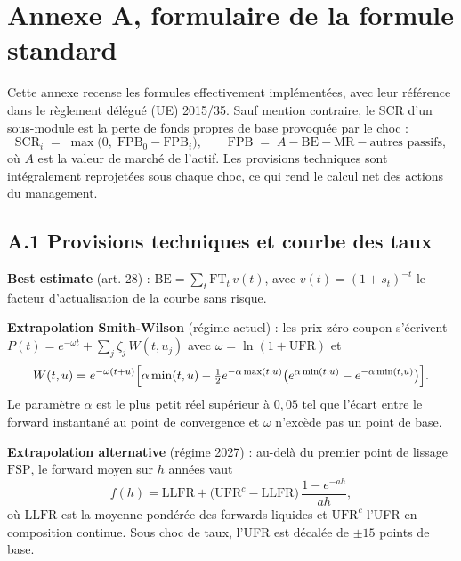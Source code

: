 
\section*{Annexe A, formulaire de la formule standard}

\small
\setlength{\parskip}{4pt}
\setlength{\parindent}{0pt}
Cette annexe recense les formules effectivement implémentées, avec leur référence dans le
règlement délégué (UE) 2015/35. Sauf mention contraire, le SCR d'un sous-module est la perte
de fonds propres de base provoquée par le choc :
\[
\mathrm{SCR}_i \;=\; \max\bigl(0,\; \mathrm{FPB}_0 - \mathrm{FPB}_i\bigr),
\qquad
\mathrm{FPB} \;=\; A - \mathrm{BE} - \mathrm{MR} - \text{autres passifs},
\]
où $A$ est la valeur de marché de l'actif. Les provisions techniques sont intégralement
reprojetées sous chaque choc, ce qui rend le calcul net des actions du management.

\subsection*{A.1 Provisions techniques et courbe des taux}

\textbf{Best estimate} (art. 28) : $\mathrm{BE} = \sum_{t} \mathrm{FT}_t \, v(t)$, avec
$v(t) = (1+s_t)^{-t}$ le facteur d'actualisation de la courbe sans risque.

\textbf{Extrapolation Smith-Wilson} (régime actuel) : les prix zéro-coupon s'écrivent
$P(t) = e^{-\omega t} + \sum_j \zeta_j\, W(t,u_j)$ avec $\omega = \ln(1+\mathrm{UFR})$ et
\[
W(t,u) = e^{-\omega(t+u)}\Bigl[\alpha\min(t,u) - \tfrac12 e^{-\alpha\max(t,u)}
\bigl(e^{\alpha\min(t,u)} - e^{-\alpha\min(t,u)}\bigr)\Bigr].
\]
Le paramètre $\alpha$ est le plus petit réel supérieur à $0{,}05$ tel que l'écart entre le
forward instantané au point de convergence et $\omega$ n'excède pas un point de base.

\textbf{Extrapolation alternative} (régime 2027) : au-delà du premier point de lissage
$\mathrm{FSP}$, le forward moyen sur $h$ années vaut
\[
f(h) = \mathrm{LLFR} + \bigl(\mathrm{UFR}^{c} - \mathrm{LLFR}\bigr)\,
\frac{1-e^{-a h}}{a h},
\]
où $\mathrm{LLFR}$ est la moyenne pondérée des forwards liquides et $\mathrm{UFR}^{c}$ l'UFR
en composition continue. Sous choc de taux, l'UFR est décalée de $\pm 15$ points de base.

